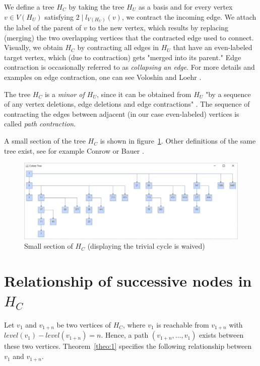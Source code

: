 \par\medskip
We define a tree $H_C$ by taking the tree $H_U$ as a basis and for every
vertex $v\in V(H_U)$ satisfying $2\mid l_{V(H_U)}(v)$, we contract the
incoming edge. We attach the label of the parent of $v$ to the new
vertex, which results by replacing (merging) the two overlapping
vertices that the contracted edge used to connect. Visually, we
obtain $H_C$ by contracting all edges in $H_U$ that have an even-labeled 
target vertex, which (due to contraction) gets "merged into its parent." 
Edge contraction is occasionally referred to as \textit{collapsing an 
edge}. For more details and examples on edge contraction, one can see
Voloshin \cite[p.~27]{Ref_Voloshin} and Loehr \cite{Ref_Loehr}.

\par\medskip
The tree $H_C$ is a \textit{minor of $H_U$}, since it can be obtained
from $H_U$ "by a sequence of any vertex deletions, edge deletions and
edge contractions" \cite[p.~32]{Ref_Voloshin}. The sequence of contracting
the edges between adjacent (in our case even-labeled) vertices is called
\textit{path contraction}.

\par\medskip
A small section of the tree $H_C$ is shown in figure~\ref{fig:2}. Other
definitions of the same tree exist, see for example Conrow 
\cite{Ref_Conrow} or Bauer \cite[p.~379]{Ref_Bauer}.

\begin{figure}
	\includegraphics[width=1.00\textwidth]{figures/h_c.png}
	\caption{Small section of $H_C$ (displaying the trivial cycle is waived)}
	\label{fig:2}
\end{figure}

\section{Relationship of successive nodes in \mbox{$H_C$}}

Let $v_1$ and $v_{1+n}$ be two vertices of $H_C$, where $v_1$ is
reachable from $v_{1+n}$ with $level(v_1)-level(v_{1+n})=n$.
Hence, a path $(v_{1+n},\ldots,v_1)$ exists between these two
vertices. Theorem~\ref{theo:1} specifies the following relationship
between $v_1$ and $v_{1+n}$.

